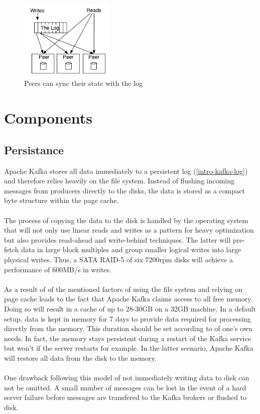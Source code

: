 \begin{figure}[H]
    \centering
    \includegraphics[width=0.4\textwidth]{images/state-machine-replication.png}
    \caption{Peers can sync their state with the log \cite{JK-TheLog}}
    \label{fig:the-log}
\end{figure}

\section{Components}
\subsection{Persistance}
Apache Kafka stores all data immediately to a persistent log
(\ref{intro-kafka-log}) 
and therefore relies heavily on the \gls{file system}.
Instead of flushing incoming messages from producers directly to the disks, the
data is stored as a compact byte structure within the \gls{page cache}.
\\ \\
The process of copying the data to the disk is handled by the operating system
that will not only use linear reads and writes  as a pattern for heavy
optimization but also provides read-ahead and write-behind techniques.
The latter will pre-fetch data in large block multiples and group smaller logical
writes into large physical writes. Thus, a SATA RAID-5 of six 7200rpm
disks will achieve a performance of 600MB/s in writes.
\\ \\
As a result of of the mentioned factors of using the file system and relying on
\gls{page cache} leads to the fact that Apache Kafka claims access to all free memory.
Doing so will result in a cache of up to 28-30GB on a 32GB machine. In a default
setup, data is kept in memory for 7 days to provide data required for processing
directly from the memory. This duration should be set according to of one's own
needs. In fact, the memory stays persistent during a restart of the Kafka
service but won't if the server restarts for example. In the latter scenario,
Apache Kafka will restore all data from the disk to the memory.
\\ \\
One drawback following this model of not immediately writing data to disk can not be
omitted. A small number of messages can be lost in the event of a hard server
failure before messages are transfered to the Kafka brokers or flushed to disk. 

